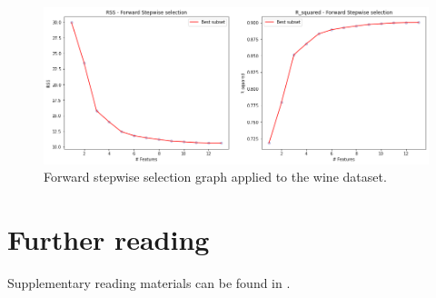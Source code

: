 \begin{figure}[hbt!]
\centering
\includegraphics[width=1\textwidth]{SectionLetsMath/dimensionalityReduction_figures/fig_selectForwardStepwise.png}
\captionsetup{type=table}
\caption{Forward stepwise selection graph applied to the wine dataset.}
\label{fig_selectForwardStepwise}
\end{figure}

\section*{Further reading}
Supplementary reading materials can be found in \cite{Dinov2018}.







